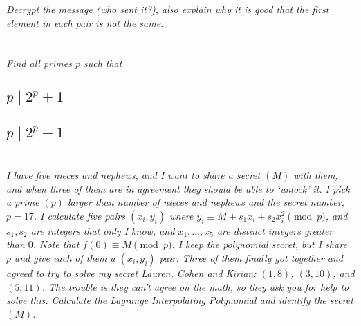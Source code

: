 \documentclass[12pt]{article}
\begin{document}
\textit{Decrypt the message (who sent it?), also explain why it is good that the first element in each pair is not the same.}

\section{} \textit{Find all primes $p$ such that}

    \subsection{$p \mid 2^p + 1$}

    \subsection{$p \mid 2^p - 1$}

\section{} \textit{I have five nieces and nephews, and I want to share a secret $(M)$ with them, and when three of them are in agreement they should be able to `unlock' it. I pick a prime $(p)$ larger than number of nieces and nephews and the secret number, $p = 17$. I calculate five pairs $(x_i, y_i)$ where $y_i \equiv M + s_1 x_i + s_2 x_i ^ 2\pmod{p}$, and $s_1, s_2$ are integers that only I know, and $x_1, \dots, x_5$ are distinct integers greater than $0$. Note that $f(0) \equiv M \pmod{p}$. I keep the polynomial secret, but I share $p$ and give each of them a $(x_i, y_i)$ pair. Three of them finally got together and agreed to try to solve my secret Lauren, Cohen and Kirian: $(1, 8)$, $(3, 10)$, and $(5, 11)$. The trouble is they can't agree on the math, so they ask you for help to solve this. Calculate the Lagrange Interpolating Polynomial and identify the secret $(M)$.}
\end{document}
